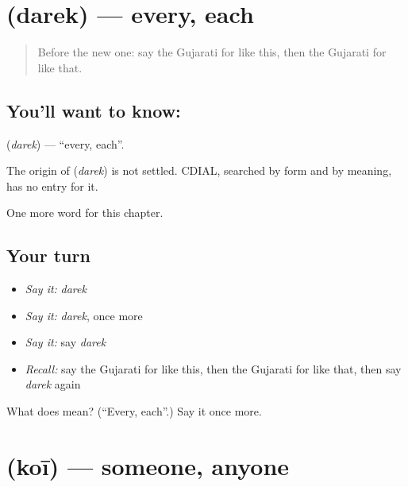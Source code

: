 \section[\texorpdfstring{\gu{દરેક} (darek)}{દરેક (darek)}]{ (darek) — every, each}

\label{lesson:GU-C99-darek}



\begin{quote}
Before the new one: say the Gujarati for like this, then the Gujarati for like that.
\end{quote}

\subsection*{You'll want to know: }
\textbf{} (\emph{darek}) — \textquotedblleft{}every, each\textquotedblright{}.

\begin{cousinweb}
The origin of \textbf{} (\emph{darek}) is not settled. CDIAL, searched by form and by meaning, has no entry for it.
\end{cousinweb}

\begin{grammarlens}[title={What you've built}]
One more word for this chapter.
\end{grammarlens}

\subsection*{Your turn}
\begin{itemize}
\raggedright
  \item \emph{Say it:} \emph{darek}
  \item \emph{Say it:} \emph{darek}, once more
  \item \emph{Say it:} say \emph{darek}
  \item \emph{Recall:} say the Gujarati for like this, then the Gujarati for like that, then say \emph{darek} again
\end{itemize}

\begin{tcolorbox}[breakable,colback=teal!4,colframe=teal!35!black,title={Before you move on}]
What does  mean? (\textquotedblleft{}Every, each\textquotedblright{}.) Say it once more.
\end{tcolorbox}
\section[\texorpdfstring{\gu{કોઈ} (koī)}{કોઈ (koī)}]{ (koī) — someone, anyone}


